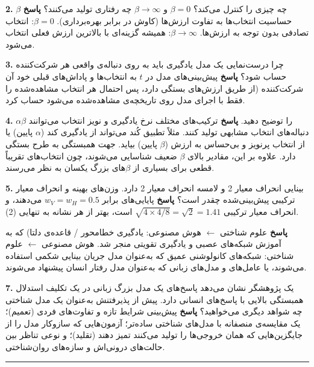 \textbf{2.}  \(\beta\) چه چیزی را کنترل می‌کند؟
\(\beta = 0\) و \(\beta \to \infty\) چه رفتاری تولید می‌کنند؟
\textbf{پاسخ} حساسیت انتخاب‌ها به تفاوت ارزش‌ها (کاوش در برابر
بهره‌برداری). \(\beta = 0\): انتخاب تصادفی بدون توجه به ارزش‌ها.
\(\beta \to \infty\): همیشه گزینه‌ای با بالاترین ارزش فعلی انتخاب می‌شود.

\textbf{3.} چرا درست‌نمایی یک مدل یادگیری باید  به 
روی دنباله‌ی واقعی هر شرکت‌کننده حساب شود؟ \textbf{پاسخ} پیش‌بینی‌های مدل در
 \(t\) به انتخاب‌ها و پاداش‌های قبلی خود آن شرکت‌کننده (از طریق
ارزش‌های  بستگی دارد، پس احتمال هر انتخاب مشاهده‌شده را فقط با
اجرای مدل روی تاریخچه‌ی مشاهده‌شده می‌شود حساب کرد.

\textbf{4.}  \(\alpha\)\lr{--}\(\beta\) را توضیح دهید.
\textbf{پاسخ} ترکیب‌های مختلف نرخ یادگیری و نویز انتخاب می‌توانند
دنباله‌های انتخاب مشابهی تولید کنند. مثلاً تطبیق کُند می‌تواند از یادگیری
کند (\(\alpha\) پایین) یا از انتخاب پرنویز و بی‌حساس به ارزش (\(\beta\)
پایین) بیاید. جهت همبستگی به طرح بستگی دارد. علاوه بر این، مقادیر بالای
\(\beta\) ضعیف شناسایی می‌شوند، چون انتخاب‌های تقریباً قطعی برای بسیاری از
\(\beta\)های بزرگ یکسان به نظر می‌رسند.

\textbf{5.} بینایی انحراف معیار 2 و لامسه انحراف معیار 2 دارد. وزن‌های
بهینه و انحراف معیار ترکیبی پیش‌بینی‌شده چقدر است؟ \textbf{پاسخ} پایایی‌های
برابر \(w_V = w_H = 0.5\) می‌دهند، و انحراف معیار ترکیبی
\(\sqrt{4 \times 4/8} = \sqrt{2} = 1.41\) است، بهتر از هر نشانه به
تنهایی (2).

\textbf{پاسخ} علوم شناختی \ensuremath{\leftarrow} هوش مصنوعی: یادگیری خطامحور
 / قاعده‌ی دلتا) که به آموزش شبکه‌های عصبی و یادگیری
تقویتی منجر شد. هوش مصنوعی \ensuremath{\leftarrow} علوم شناختی: شبکه‌های کانولوشنی عمیق که
به‌عنوان مدل جریان بینایی شکمی  استفاده
می‌شوند، یا عامل‌های  و مدل‌های زبانی که به‌عنوان مدل رفتار انسان
پیشنهاد می‌شوند.

\textbf{7.} یک پژوهشگر نشان می‌دهد پاسخ‌های یک مدل بزرگ زبانی در یک تکلیف
استدلال همبستگی بالایی با پاسخ‌های انسانی دارد. پیش از پذیرفتنش به‌عنوان
یک مدل شناختی چه شواهد دیگری می‌خواهید؟ \textbf{پاسخ} پیش‌بینی شرایط تازه
و تفاوت‌های فردی (تعمیم)؛ یک مقایسه‌ی منصفانه با مدل‌های شناختی ساده‌تر؛
آزمون‌هایی که سازوکار مدل را از جایگزین‌هایی که همان خروجی‌ها را تولید
می‌کنند تمیز دهند (تقلید)؛ و نوعی تناظر بین حالت‌های درونی‌اش و سازه‌های
روان‌شناختی.

\begin{center}\rule{0.5\linewidth}{0.5pt}\end{center}

